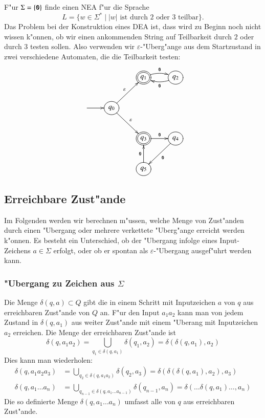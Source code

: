 \begin{beispiel}[\bf Teilbarkeit]
F"ur $\Sigma=\{{\tt 0}\}$ finde einen NEA f"ur die Sprache 
\[
L=\{w\in \Sigma^*\;|\; \text{$|w|$ ist durch 2 oder 3 teilbar}\}.
\]
Das Problem bei der Konstruktion eines DEA ist, dass wird zu
Beginn noch nicht wissen k"onnen, ob wir einen ankommenden
String auf Teilbarkeit durch $2$ oder durch $3$ testen sollen.
Also verwenden wir $\varepsilon$-"Uberg"ange aus dem Startzustand
in zwei verschiedene Automaten, die die Teilbarkeit testen:
\[
\entrymodifiers={++[o][F]}
\xymatrix{
*+\txt{}
	&*+\txt{}
		&*++[o][F=]{q_1} \ar@/^/[r]^{\tt 0}
			&{q_2} \ar@/^/[l]^{\tt 0}
\\
*+\txt{} \ar[r]
	&{q_0}\ar[ur]^{\varepsilon} \ar[dr]^{\varepsilon}
\\
*+\txt{}
	&*+\txt{}
		&*++[o][F=]{q_3}\ar[r]^{\tt 0}
			&{q_4}\ar[dl]^{\tt 0}
\\
*+\txt{}
	&*+\txt{}
		&{q_5}\ar[u]^{\tt 0}
}
\]
\end{beispiel}

\subsection{Erreichbare Zust"ande}
Im Folgenden werden wir berechnen m"ussen, welche Menge von Zust"anden
durch einen "Ubergang oder mehrere verkettete "Uberg"ange erreicht werden
k"onnen.  Es besteht ein Unterschied, ob der "Ubergang infolge eines
Input-Zeichens $a\in\Sigma$ erfolgt, oder ob er spontan als
$\varepsilon$-"Ubergang ausgef"uhrt werden kann.

\subsubsection{"Ubergang zu Zeichen aus $\Sigma$}
Die Menge $\delta(q,a)\subset Q$ gibt die in einem Schritt mit Inputzeichen $a$
von $q$ aus erreichbaren Zust"ande von $Q$ an. F"ur den Input $a_1a_2$ kann
man von jedem Zustand in $\delta(q,a_1)$ aus weiter Zust"ande mit einem
"Uberang mit Inputzeichen $a_2$ erreichen. Die Menge der erreichbaren
Zust"ande ist
\begin{equation}
\delta(q,a_1a_2)=\bigcup_{q_1\in\delta(q,a_1)}\delta(q_1, a_2)
=\delta(\delta(q,a_1),a_2)
\label{erreichbar}
\end{equation}
Dies kann man wiederholen:
\begin{align*}
\delta(q,a_1a_2a_3)&=
\bigcup_{q_2\in\delta(q, a_1a_2)}\delta(q_2,a_3)
=
\delta(\delta(\delta(q,a_1),a_2),a_3)
\\
\delta(q,a_1\dots a_n)&=\bigcup_{q_{n-1}\in\delta(q,a_1\dots a_{n-1})}\delta(q_{n-1},a_n)
=\delta(\dots \delta(q,a_1)\dots,a_n)
\end{align*}
Die so definierte Menge $\delta(q,a_1\dots a_n)$ umfasst alle von
$q$ aus erreichbaren Zust"ande.

